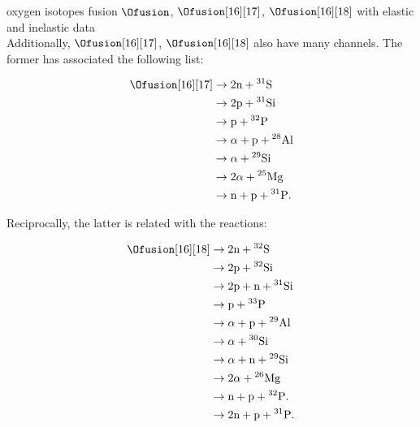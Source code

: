 \documentclass[openany]{book}
\begin{document}
oxygen isotopes fusion $\Ofusion$, $\Ofusion[16][17]$, $\Ofusion[16][18]$ with elastic and inelastic data \cite{thomas_chen_hinds_meredith_olson_1986} \\

Additionally, $\Ofusion[16][17]$, $\Ofusion[16][18]$ also have many channels. The former has associated the following list: 

\begin{equation}\label{eq:middleFusion_experimental_16O17O_channels}
	\begin{split}
		\Ofusion[16][17] &\rightarrow \mathrm{2n + {}^{31}S} \\
		&\rightarrow \mathrm{2p + {}^{31}Si} \\
		&\rightarrow \mathrm{p + {}^{32}P} \\
		&\rightarrow \mathrm{\alpha + p + {}^{28}Al} \\
		&\rightarrow \mathrm{\alpha + {}^{29}Si} \\
		&\rightarrow \mathrm{2\alpha + {}^{25}Mg} \\
		&\rightarrow \mathrm{n + p + {}^{31}P}. \\
	\end{split}
\end{equation}

Reciprocally, the latter is related with the reactions:


\begin{equation}\label{eq:middleFusion_experimental_16O18O_channels}
	\begin{split}
		\Ofusion[16][18] &\rightarrow \mathrm{2n + {}^{32}S} \\
		&\rightarrow \mathrm{2p + {}^{32}Si} \\
		&\rightarrow \mathrm{2p + n + {}^{31}Si} \\
		&\rightarrow \mathrm{p + {}^{33}P} \\
		&\rightarrow \mathrm{\alpha + p + {}^{29}Al} \\
		&\rightarrow \mathrm{\alpha + {}^{30}Si} \\
		&\rightarrow \mathrm{\alpha + n + {}^{29}Si} \\
		&\rightarrow \mathrm{2\alpha + {}^{26}Mg} \\
		&\rightarrow \mathrm{n + p + {}^{32}P}. \\
		&\rightarrow \mathrm{2n + p + {}^{31}P}. \\
	\end{split}
\end{equation}
\end{document}
